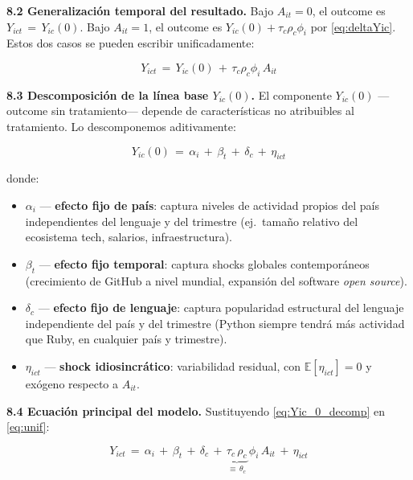 \documentclass[11pt,a4paper]{article}
\theoremstyle{definition}
\begin{document}
\textbf{8.2 Generalización temporal del resultado.} Bajo $A_{it} = 0$, el outcome es $Y_{ict} \,=\, Y_{ic}(0)$. Bajo $A_{it} = 1$, el outcome es $Y_{ic}(0) + \tau_c\rho_c\phi_i$ por \eqref{eq:deltaYic}. Estos dos casos se pueden escribir unificadamente:

\begin{equation}
Y_{ict} \,=\, Y_{ic}(0) \,+\, \tau_c\rho_c\phi_i\,A_{it}
\label{eq:unif}
\end{equation}

\textbf{8.3 Descomposición de la línea base $Y_{ic}(0)$.} El componente $Y_{ic}(0)$ ---outcome sin tratamiento--- depende de características no atribuibles al tratamiento. Lo descomponemos aditivamente:

\begin{equation}
Y_{ic}(0) \,=\, \alpha_i \,+\, \beta_t \,+\, \delta_c \,+\, \eta_{ict}
\label{eq:Yic_0_decomp}
\end{equation}

donde:
\begin{itemize}[leftmargin=*]
  \item $\alpha_i$ --- \textbf{efecto fijo de país}: captura niveles de actividad propios del país independientes del lenguaje y del trimestre (ej.\ tamaño relativo del ecosistema tech, salarios, infraestructura).
  \item $\beta_t$ --- \textbf{efecto fijo temporal}: captura shocks globales contemporáneos (crecimiento de GitHub a nivel mundial, expansión del software \textit{open source}).
  \item $\delta_c$ --- \textbf{efecto fijo de lenguaje}: captura popularidad estructural del lenguaje independiente del país y del trimestre (Python siempre tendrá más actividad que Ruby, en cualquier país y trimestre).
  \item $\eta_{ict}$ --- \textbf{shock idiosincrático}: variabilidad residual, con $\mathbb{E}[\eta_{ict}] = 0$ y exógeno respecto a $A_{it}$.
\end{itemize}

\textbf{8.4 Ecuación principal del modelo.} Sustituyendo \eqref{eq:Yic_0_decomp} en \eqref{eq:unif}:

\begin{prop}[]
\begin{equation}
\boxed{\;Y_{ict} \,=\, \alpha_i \,+\, \beta_t \,+\, \delta_c \,+\, \underbrace{\tau_c\,\rho_c}_{\equiv\,\theta_c}\,\phi_i\,A_{it} \,+\, \eta_{ict}\;}
\label{eq:principal}
\end{equation}
\end{prop}
\end{document}
